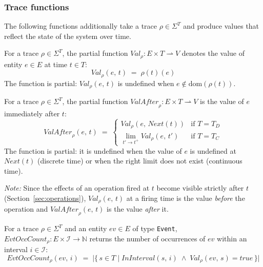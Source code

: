 \subsubsection{Trace functions}\label{subsec:trace}

The following functions additionally take a trace $\rho \in \Sigma^T$ and produce values that reflect the state of the system over time.

\begin{definition}[]\label{def:expr_val}
    For a trace $\rho \in \Sigma^T$, the partial function $\mathit{Val}_\rho: E \times T \rightharpoonup V$ denotes the value of entity $e \in E$ at time $t \in T$:
    \[
        \mathit{Val}_\rho(e,\, t) \;=\; \rho(t)(e)
    \]
    The function is partial: $\mathit{Val}_\rho(e,\, t)$ is undefined when $e \notin \mathrm{dom}(\rho(t))$.
\end{definition}

\begin{definition}\label{def:val_after}
    For a trace $\rho \in \Sigma^T$, the partial function $\mathit{ValAfter}_\rho : E \times T \rightharpoonup V$ is the value of $e$ immediately after $t$:
    \[
        \mathit{ValAfter}_\rho(e,\, t) \;=\; \begin{cases}
            \mathit{Val}_\rho(e,\, \mathit{Next}(t))       & \text{if } T = T_D \\
            \lim_{t' \to t^+} \mathit{Val}_\rho(e,\, t') & \text{if } T = T_C
        \end{cases}
    \]
    The function is partial: it is undefined when the value of $e$ is undefined at $\mathit{Next}(t)$ (discrete time) or when the right limit does not exist (continuous time).

    \textit{Note:} Since the effects of an operation fired at $t$ become visible strictly after $t$ (Section~\ref{sec:operations}), $\mathit{Val}_\rho(e,\, t)$ at a firing time is the value \emph{before} the operation and $\mathit{ValAfter}_\rho(e,\, t)$ is the value \emph{after} it.
\end{definition}

\begin{definition}\label{def:evt_occ_count}
    For a trace $\rho \in \Sigma^T$ and an entity $ev \in E$ of type \texttt{Event},
    $\mathit{EvtOccCount}_\rho : E \times \mathcal{I} \rightarrow \mathbb{N}$ returns the number of occurrences of $ev$ within an interval $i \in \mathcal{I}$:
    \[
        \mathit{EvtOccCount}_\rho(ev,\, i) \;=\; \bigl|\{\, s \in T \mid \mathit{InInterval}(s,\, i) \;\land\; \mathit{Val}_\rho(ev,\, s) = \mathit{true} \,\}\bigr|
    \]
\end{definition}

